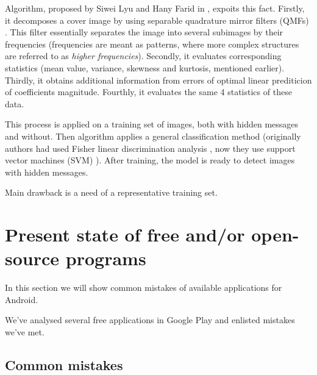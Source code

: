 Algorithm, proposed by Siwei Lyu and Hany Farid in \cite{lyu2002detecting}, expoits this fact.
Firstly, it decomposes a cover image by using separable quadrature mirror filters (QMFs) \cite{vaidyanathan1987quadrature}.
This filter essentially separates the image into several subimages by their frequencies (frequencies are meant as patterns,
where more complex structures are referred to as \emph{higher frequencies}).
Secondly, it evaluates corresponding statistics (mean value, variance, skewness and kurtosis, mentioned earlier).
Thirdly, it obtains additional information from errors of optimal linear prediticion of coefficients magnitude.
Fourthly, it evaluates the same 4 statistics of these data.

This process is applied on a training set of images, both with hidden messages and without. Then algorithm
applies a general classification method (originally authors had used Fisher linear discrimination analysis \cite{welling2005fisher}, now
they use support vector machines (SVM) \cite{vapnik2013nature}). After training, the model is ready to detect images with hidden messages.

Main drawback is a need of a representative training set. 



\section{Present state of free and/or open-source programs}
In this section we will show common mistakes of available applications for Android.

We've analysed several free applications in Google Play 
\cite{app0,app1,app2,app3,app4,app5,app6,app7,app8,app9,app10,app11,app12,app13,app14,app15,app16,app17,app18,app19} 
and enlisted mistakes we've met.

\subsection{Common mistakes}

